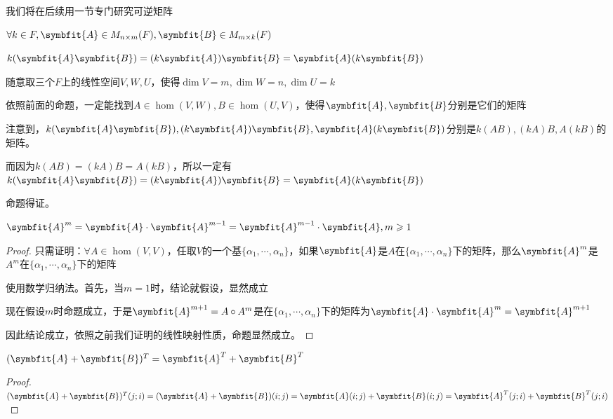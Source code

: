 \documentclass[12pt, a4paper, oneside, UTF8]{ctexbook}
\begin{document}
\begin{para}{0}
					我们将在后续用一节专门研究可逆矩阵
				\point{}
					\begin{proposition}
						$\forall k \in F,\symbfit{A} \in M_{n \times m}(F),\symbfit{B} \in M_{m \times k}(F)$

						$k(\symbfit{A}\symbfit{B})=(k\symbfit{A})\symbfit{B}=\symbfit{A}(k\symbfit{B})$
					\end{proposition}
					\begin{proposition}
						随意取三个$F$上的线性空间$V,W,U$，使得$\dim V = m,\dim W = n,\dim U = k$

						依照前面的命题，一定能找到$A \in \hom(V,W),B \in \hom(U,V)$，使得$\symbfit{A},\symbfit{B}$分别是它们的矩阵

						注意到，$k(\symbfit{A}\symbfit{B}),(k\symbfit{A})\symbfit{B},\symbfit{A}(k\symbfit{B})$分别是$k(AB),(kA)B,A(kB)$的矩阵。
						
						而因为$k(AB)=(kA)B=A(kB)$，所以一定有$k(\symbfit{A}\symbfit{B})=(k\symbfit{A})\symbfit{B}=\symbfit{A}(k\symbfit{B})$
						
						命题得证。
					\end{proposition}
				\point{}
					\begin{proposition}
						$\symbfit{A}^{m} = \symbfit{A} \cdot \symbfit{A}^{m-1} = \symbfit{A}^{m-1}\cdot \symbfit{A},m \geqslant 1$
					\end{proposition}
					\begin{proof}
						只需证明：$\forall A \in \hom(V,V)$，任取$V$的一个基$\{\alpha_1,\cdots,\alpha_n\}$，如果$\symbfit{A}$是$A$在$\{\alpha_1,\cdots,\alpha_n\}$下的矩阵，那么$\symbfit{A}^m$是$A^m$在$\{\alpha_1,\cdots,\alpha_n\}$下的矩阵

						使用数学归纳法。首先，当$m=1$时，结论就假设，显然成立

						现在假设$m$时命题成立，于是$\symbfit{A}^{m+1}=A \circ A^m$是在$\{\alpha_1,\cdots,\alpha_n\}$下的矩阵为$\symbfit{A}\cdot\symbfit{A}^m=\symbfit{A}^{m+1}$

						因此结论成立，依照之前我们证明的线性映射性质，命题显然成立。
					\end{proof}
				\point{}
					\begin{proposition}
						$(\symbfit{A}+\symbfit{B})^T = \symbfit{A}^T+\symbfit{B}^T$
					\end{proposition}
					\begin{proof}
						$(\symbfit{A}+\symbfit{B})^T (j;i) = (\symbfit{A}+\symbfit{B})(i;j) = \symbfit{A}(i;j)+\symbfit{B}(i;j)=\symbfit{A}^T(j;i)+\symbfit{B}^T(j;i)$


\end{proof}
\end{para}
\end{document}
